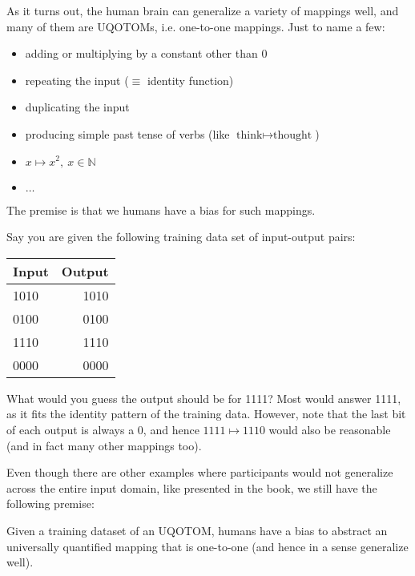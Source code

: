 \documentclass[../../main.tex]{subfiles}
\begin{document}
    As it turns out, the human brain can generalize a variety of mappings well, and many of them are UQOTOMs, i.e. one-to-one mappings. Just to name a few:
    \begin{itemize}
        \item adding or multiplying by a constant other than 0
        \item repeating the input ($\equiv$ identity function)
        \item duplicating the input
        \item producing simple past tense of verbs (like $\text{think} \mapsto \text{thought}$)
        \item $x \mapsto x^2, \ x \in \mathbb{N}$
        \item $\dots$
    \end{itemize}

    The premise is that we humans have a bias for such mappings.

    \begin{example}
        \label{example:uqotom_bias}
        Say you are given the following training data set of input-output pairs:
        \begin{center}
            \begin{tabular}{l|r}
                Input & Output \\
                \hline
                1010 & 1010 \\
                0100 & 0100 \\
                1110 & 1110 \\
                0000 & 0000 \\
            \end{tabular}
        \end{center}

        What would you guess the output should be for 1111? Most would answer 1111, as it fits the identity pattern of the training data. However, note that the last bit of each output is always a 0, and hence $1111 \mapsto 1110$ would also be reasonable (and in fact many other mappings too).
    \end{example}

    Even though there are other examples where participants would not generalize across the entire input domain, like presented in the book, we still have the following premise:

    \begin{premise}
        Given a training dataset of an UQOTOM, humans have a bias to abstract an universally quantified mapping that is one-to-one (and hence in a sense generalize well).
    \end{premise}
\end{document}
